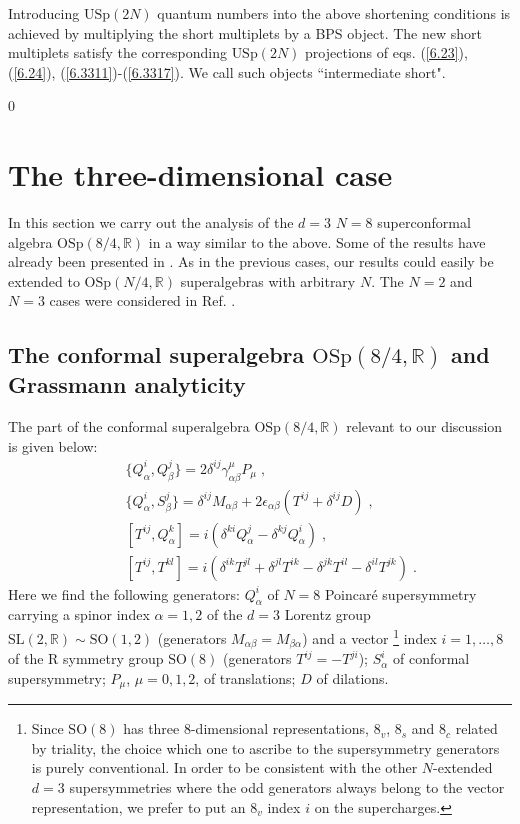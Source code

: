 \documentclass[a4paper,12pt]{article}
\begin{document}
Introducing $\mbox{USp}(2N)$ quantum numbers into the above 
shortening conditions is achieved by multiplying the short 
multiplets by a BPS object. The new short multiplets satisfy the 
corresponding $\mbox{USp}(2N)$ projections of eqs. (\ref{6.23}), 
(\ref{6.24}), (\ref{6.3311})-(\ref{6.3317}). We call such objects 
``intermediate short".
 






\setcounter{equation}0 
\section{The three-dimensional case}


In this section we carry out the analysis of the $d=3$ $N=8$ 
superconformal algebra $\mbox{OSp}(8/4,\mathbb{R})$ in a way 
similar to the above. Some of the results have already been 
presented in \cite{FS2}. As in the previous cases, our results 
could easily be extended to $\mbox{OSp}(N/4,\mathbb{R})$ 
superalgebras with arbitrary $N$. The $N=2$ and $N=3$ cases were 
considered in Ref. \cite{Torino}.

\subsection{The conformal superalgebra $\mbox{OSp}(8/4,\mathbb{R})$ 
and Grassmann analyticity}\label{CSGA} 

The part of the conformal superalgebra 
$\mbox{OSp}(8/4,\mathbb{R})$ relevant to our discussion is given 
below: 
\begin{eqnarray}
  && \{Q^i_\alpha, Q^j_\beta\} = 2\delta^{ij} \gamma^\mu_{\alpha\beta} 
P_\mu\;, \label{7.1}\\
  && \{Q^i_\alpha, S^j_\beta\} = \delta^{ij} 
M_{\alpha\beta} + 2\epsilon_{\alpha\beta}  (T^{ij} +  \delta^{ij} 
D) \;, \label{7.2}\\  
  && [T^{ij}, Q^k_\alpha] = i(\delta^{ki} Q^j_\alpha - \delta^{kj} 
Q^i_\alpha)\;,\label{7.3}\\ 
  && [T^{ij}, T^{kl}] = i(\delta^{ik} T^{jl} + \delta^{jl} T^{ik} 
- \delta^{jk} T^{il} - \delta^{il} T^{jk})\;. \label{7.4} 
\end{eqnarray}
Here we find the following generators: $Q^i_\alpha$ of $N=8$ 
Poincar\'{e} supersymmetry carrying a spinor index $\alpha=1,2$ of the 
$d=3$ Lorentz group $\mbox{SL}(2,\mathbb{R})\sim \mbox{SO}(1,2)$ 
(generators $M_{\alpha\beta} = M_{\beta\alpha}$) and a vector 
\footnote{Since $\mbox{SO}(8)$ has three 8-dimensional 
representations, $8_v$, $8_s$ and  $8_c$ related by triality, the 
choice which one to ascribe to the supersymmetry generators is 
purely conventional. In order to be consistent with the other 
$N$-extended $d=3$ supersymmetries where the odd generators always 
belong to the vector representation, we prefer to put an $8_v$ 
index $i$ on the supercharges.} index $i=1,\ldots,8$ of the R 
symmetry group $\mbox{SO}(8)$ (generators $T^{ij}=-T^{ji}$); 
$S^i_\alpha$ of conformal supersymmetry; $P_\mu$, $\mu=0,1,2$, of 
translations; $D$ of dilations. 
\end{document}
